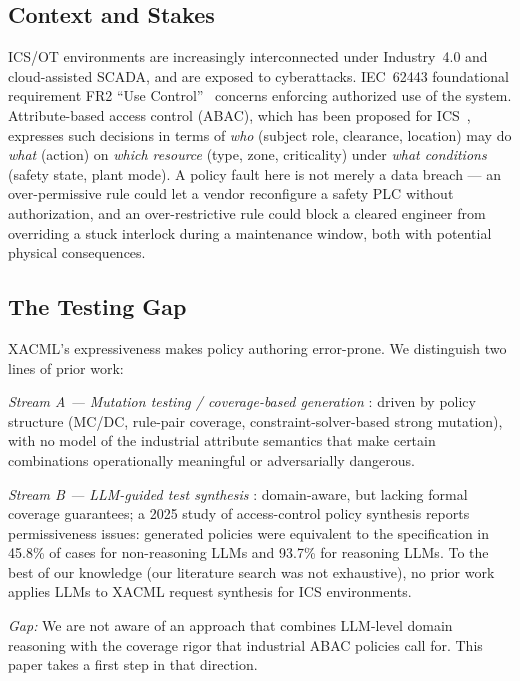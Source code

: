 \documentclass[conference]{IEEEtran}
\begin{document}
\subsection{Context and Stakes}

ICS/OT environments are increasingly interconnected under Industry~4.0 and
cloud-assisted SCADA, and are exposed to cyberattacks.
IEC~62443 foundational requirement FR2 ``Use Control''~\cite{b10} concerns
enforcing authorized use of the system. Attribute-based access control (ABAC),
which has been proposed for ICS~\cite{b19,b20}, expresses such decisions in terms
of \textit{who} (subject role, clearance, location) may do \textit{what}
(action) on \textit{which resource} (type, zone, criticality) under
\textit{what conditions} (safety state, plant mode). A policy fault here is not
merely a data breach --- an over-permissive rule could let a vendor reconfigure
a safety PLC without authorization, and an over-restrictive rule could block a
cleared engineer from overriding a stuck interlock during a maintenance window,
both with potential physical consequences.

\subsection{The Testing Gap}

XACML's expressiveness makes policy authoring error-prone. We distinguish two
lines of prior work:

\textit{Stream A --- Mutation testing / coverage-based generation}
\cite{b1,b2,b3,b4,b5}: driven by policy structure (MC/DC, rule-pair coverage,
constraint-solver-based strong mutation), with no model of the industrial
attribute semantics that make certain combinations operationally meaningful or
adversarially dangerous.

\textit{Stream B --- LLM-guided test synthesis} \cite{b11,b12,b13,b14,b15}:
domain-aware, but lacking formal coverage guarantees; a 2025 study of
access-control policy synthesis \cite{b12} reports permissiveness issues:
generated policies were equivalent to the specification in 45.8\% of cases for
non-reasoning LLMs and 93.7\% for reasoning LLMs. To the best of our knowledge
(our literature search was not exhaustive), no prior work applies LLMs to XACML
request synthesis for ICS environments.

\textit{Gap:} We are not aware of an approach that combines LLM-level domain
reasoning with the coverage rigor that industrial ABAC policies call for. This
paper takes a first step in that direction.
\end{document}
